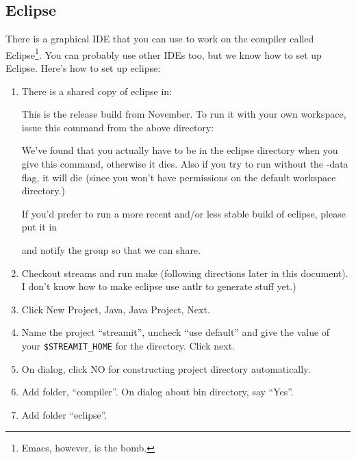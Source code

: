 \subsection{Eclipse}
There is a graphical IDE that you can use to work on the compiler
called Eclipse\footnote{Emacs, however, is the bomb.}. You can
probably use other IDEs too, but we know how to set up Eclipse.
Here's how to set up eclipse:
\begin{enumerate}

\item There is a shared copy of eclipse in:


This is the release build from November.  To run it with your own
workspace, issue this command from the above directory:


We've found that you actually have to be in the eclipse directory when
you give this command, otherwise it dies.  Also if you try to run
without the -data flag, it will die (since you won't have permissions
on the default workspace directory.)

If you'd prefer to run a more recent and/or less stable build of
eclipse, please put it in 


\noindent and notify the group so that we can share.

\item Checkout streams and run make (following directions later in
 this document).  I don't know how to make eclipse use antlr to
 generate stuff yet.)

\item Click New Project, Java, Java Project, Next.

\item Name the project ``streamit'', uncheck ``use default'' and give
the value of your {\tt \$STREAMIT\_HOME} for the directory.  Click
next.

\item On dialog, click NO for constructing project directory
automatically.

\item Add folder, ``compiler''.  On dialog about bin directory, say
``Yes''.

\item Add folder ``eclipse''.


\end{enumerate}
